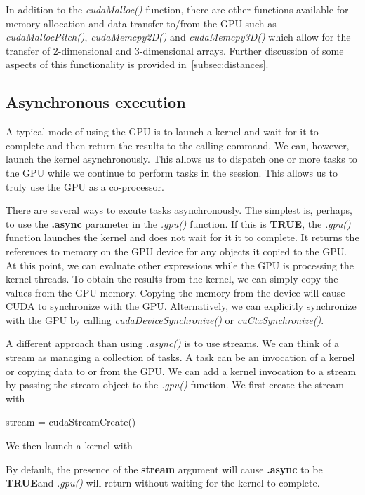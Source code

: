 \documentclass[article]{jss}
\def\Rtrue{\textbf{TRUE}}
\def\R{\proglang{R}}
\def\Rfunc#1{\textsl{#1()}}
\def\Rarg#1{\textbf{#1}}
\begin{document}
In addition to the \Rfunc{cudaMalloc} function, there
are other functions available for memory allocation and data transfer to/from
the GPU such as \Rfunc{cudaMallocPitch}, \Rfunc{cudaMemcpy2D} 
and \Rfunc{cudaMemcpy3D} which allow for the transfer of 
2-dimensional and 3-dimensional arrays. Further discussion
of some aspects of this functionality is provided in~\ref{subsec:distances}.

\subsection{Asynchronous execution}
A typical mode of using the GPU is to launch a kernel and wait for it
to complete and then return the results to the \R{} calling command.
We can, however, launch the kernel asynchronously.  This allows us to
dispatch one or more tasks to the GPU while we continue to perform
tasks in the \R{} session.  This allows us to truly use the GPU as a
co-processor.

There are several ways to excute tasks asynchronously.  The simplest
is, perhaps, to use the \Rarg{.async} parameter in the \Rfunc{.gpu}
function.  If this is \Rtrue, the \Rfunc{.gpu} function launches the
kernel and does not wait for it it to complete.  It returns the
references to memory on the GPU device for any objects it copied to
the GPU.  At this point, we can evaluate other \R{} expressions while
the GPU is processing the kernel threads.  To obtain the results from
the kernel, we can simply copy the values from the GPU memory.
Copying the memory from the device will cause CUDA to synchronize with
the GPU.  Alternatively, we can explicitly synchronize with the GPU by
calling \Rfunc{cudaDeviceSynchronize} or \Rfunc{cuCtxSynchronize}.

A different approach than using \Rfunc{.async} is to use streams.  We
can think of a stream as managing a collection of tasks. A task can be
an invocation of a kernel or copying data to or from the GPU.  We can
add a kernel invocation to a stream by passing the stream object to
the \Rfunc{.gpu} function.
We first create the stream with
\begin{RCode}
stream = cudaStreamCreate()
\end{RCode}
We then launch a kernel with
By default, the presence of the \Rarg{stream} argument
will cause \Rarg{.async} to be \Rtrue and 
\Rfunc{.gpu} will return without waiting for the kernel
to complete.
\end{document}
